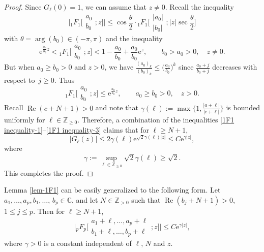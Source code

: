 \documentclass[10pt,a4paper]{amsart}
\numberwithin{equation}{section}
\newcommand{\CC}{\ensuremath{\mathbb{C}}}
\newcommand{\ZZ}{\ensuremath{\mathbb{Z}}}
\newcommand{\me}{\mathrm{e}}
\begin{document}
\begin{proof}
	Since $G_{\ell}(0)=1$, we can assume that $z\ne 0$. Recall the inequality \cite[equation~(2.3)]{Joshi_Arya-1982}
	\begin{equation}\label{1F1 inequality-1}
		\biggl|{}_1F_1\bigg[\begin{matrix}
			a_0\\
			b_0
		\end{matrix};z\bigg]\biggr|\leqslant \cos\frac{\theta}{2}\cdot
		{}_1F_1\biggl[\begin{matrix}
			|a_0|\\
			|b_0|
		\end{matrix};|z|\sec\frac{\theta}{2}\bigg]
	\end{equation}
	with $\theta=\arg(b_0)\in (-\pi,\pi)$ and the inequality \cite[p. 37, equation~(3.5)]{Carlson-1966}
	\begin{equation}\label{1F1 inequality-2}
		\me^{\frac{a_0}{b_0}z}<{}_1F_1\biggl[\begin{matrix}
			a_0\\
			b_0
		\end{matrix};z\biggr]<1-\frac{a_0}{b_0}+\frac{a_0}{b_0}\me^z,\qquad b_0>a_0>0,\quad z\ne 0.
	\end{equation}
	But when $a_0\geqslant b_0>0$ and $z>0$, we have $\frac{(a_0)_k}{(b_0)_k}\leqslant \big(\frac{a_0}{b_0}\big)^k$ since $\frac{a_0+j}{b_0+j}$ decreases with respect to~${j\geqslant 0}$. Thus
	\begin{equation}\label{1F1 inequality-3}
		{}_1F_1\biggl[\begin{matrix}
			a_0\\
			b_0
		\end{matrix};z\biggr]\leqslant\me^{\frac{a_0}{b_0}z},\qquad a_0\geqslant b_0>0,\quad z>0.
	\end{equation}
	Recall $\operatorname{Re}(c+N+1)>0$ and note that $\gamma(\ell):=\max\bigl\{1,\frac{|a+\ell|}{|c+\ell|}\bigr\}$ is bounded uniformly for $\ell\in\ZZ_{\geqslant 0}$. Therefore, a combination of the inequalities \eqref{1F1 inequality-1}--\eqref{1F1 inequality-3} claims that for $\ell\geqslant N+1$,
	\[|G_\ell(z)|\leqslant 2\gamma(\ell)\me^{\sqrt{2}\gamma(\ell)|z|}\leqslant C\me^{\gamma|z|},\]
	where
	\[\gamma:=\sup_{\ell\in\ZZ_{\geqslant 0}}\sqrt{2}\gamma(\ell)\geqslant \sqrt{2}.\]
	This completes the proof.
\end{proof}

\begin{Remark}
	Lemma \ref{lem-1F1} can be easily generalized to the following form. Let $a_1,\dots,a_p,b_1,\dots$, $b_p\in\CC$, and let $N\in\ZZ_{>0}$ such that $\operatorname{Re}(b_j+N+1)>0$, $1\leqslant j\leqslant p$. Then for $\ell\geqslant N+1$,
		\begin{equation}\label{pFp estimate}
			\biggl|{}_pF_p\biggl[\begin{matrix}
				a_1+\ell,\dots,a_p+\ell\\
				b_1+\ell,\dots,b_p+\ell
			\end{matrix};z\biggr]\biggr|\leqslant C\me^{\gamma|z|},
		\end{equation}
		where $\gamma>0$ is a constant independent of $\ell$, $N$ and $z$.
\end{Remark}
\end{document}

